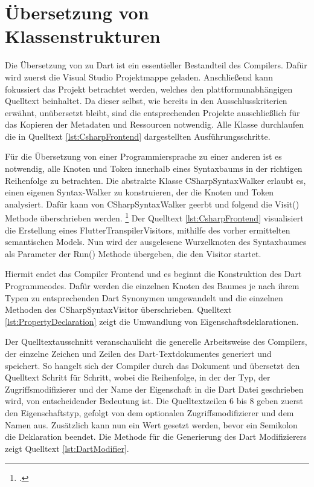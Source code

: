 \section{Übersetzung von Klassenstrukturen}

Die Übersetzung von \Csharp{} zu Dart ist ein essentieller Bestandteil des Compilers.  Dafür wird zuerst die Visual Studio Projektmappe geladen.  Anschließend kann fokussiert das Projekt betrachtet werden, welches den plattformunabhängigen Quelltext beinhaltet.  Da dieser selbst, wie bereits in den Ausschlusskriterien erwähnt,  unübersetzt bleibt, sind die entsprechenden Projekte ausschließlich für das Kopieren der Metadaten und Ressourcen notwendig.  Alle Klasse durchlaufen die in Quelltext \ref{lst:CsharpFrontend} dargestellten Ausführungsschritte. 

Für die Übersetzung von einer Programmiersprache zu einer anderen ist es notwendig,  alle Knoten und Token innerhalb eines Syntaxbaums in der richtigen Reihenfolge zu betrachten.  Die abstrakte Klasse \glq CSharpSyntaxWalker\grq{} erlaubt es,  einen eigenen \glq Syntax-Walker\grq{} zu konstruieren,  der die Knoten und Token analysiert.  Dafür kann von \glq CSharpSyntaxWalker\grq{} geerbt und folgend die \glq Visit()\grq{} Methode überschrieben werden.  \footcite[Vgl.][Abgerufen am \today]{Varty2014}  Der Quelltext \ref{lst:CsharpFrontend} visualisiert die Erstellung eines \glq FlutterTranspilerVisitors\grq ,  mithilfe des vorher ermittelten semantischen Models.  Nun wird der ausgelesene Wurzelknoten des Syntaxbaumes als Parameter der \glq Run()\grq{} Methode übergeben,  die den \glq Visitor\grq{} startet.  

Hiermit endet das Compiler Frontend und es beginnt die Konstruktion des Dart Programmcodes.  Dafür werden die einzelnen Knoten des Baumes je nach ihrem Typen zu entsprechenden Dart Synonymen umgewandelt und die einzelnen Methoden des \glq CSharpSyntaxVisitor\grq{} überschrieben.  Quelltext \ref{lst:PropertyDeclaration} zeigt die Umwandlung von Eigenschaftsdeklarationen.
\newpage


Der Quelltextausschnitt veranschaulicht die generelle Arbeitsweise des Compilers,  der einzelne Zeichen und Zeilen des Dart-Textdokumentes generiert und speichert.  So hangelt sich der Compiler durch das Dokument und übersetzt den Quelltext Schritt für Schritt, wobei die Reihenfolge, in der der Typ, der Zugriffsmodifizierer und der Name der Eigenschaft in die Dart Datei geschrieben wird,  von entscheidender Bedeutung ist.  Die Quelltextzeilen 6 bis 8 geben zuerst den Eigenschaftstyp,  gefolgt von dem optionalen Zugriffsmodifizierer und dem Namen aus.  Zusätzlich kann nun ein Wert gesetzt werden,  bevor ein Semikolon die Deklaration beendet.  Die Methode für die Generierung des Dart Modifizierers zeigt Quelltext \ref{lst:DartModifier}.


